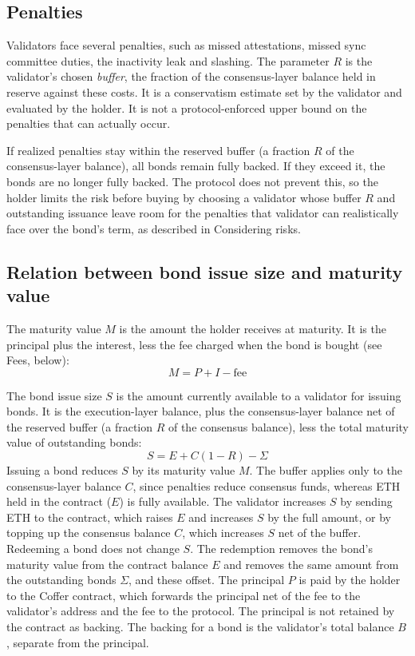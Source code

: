\documentclass{article}
\begin{document}
\subsection{Penalties}
Validators face several penalties, such as missed attestations, missed sync committee duties, the inactivity leak and slashing. The parameter \(R\) is the validator's chosen \textit{buffer}, the fraction of the consensus-layer balance held in reserve against these costs. It is a conservatism estimate set by the validator and evaluated by the holder. It is not a protocol-enforced upper bound on the penalties that can actually occur.

If realized penalties stay within the reserved buffer (a fraction \(R\) of the consensus-layer balance), all bonds remain fully backed. If they exceed it, the bonds are no longer fully backed. The protocol does not prevent this, so the holder limits the risk before buying by choosing a validator whose buffer \(R\) and outstanding issuance leave room for the penalties that validator can realistically face over the bond's term, as described in Considering risks.

\subsection{Relation between bond issue size and maturity value}
The maturity value \(M\) is the amount the holder receives at maturity. It is the principal plus the interest, less the fee charged when the bond is bought (see Fees, below):
\[
    M = P + I - \text{fee}
\]

The bond issue size \(S\) is the amount currently available to a validator for issuing bonds. It is the execution-layer balance, plus the consensus-layer balance net of the reserved buffer (a fraction \(R\) of the consensus balance), less the total maturity value of outstanding bonds:
\[
    S = E + C(1 - R) - \Sigma
\]
Issuing a bond reduces \(S\) by its maturity value \(M\). The buffer applies only to the consensus-layer balance \(C\), since penalties reduce consensus funds, whereas ETH held in the contract (\(E\)) is fully available. The validator increases \(S\) by sending ETH to the contract, which raises \(E\) and increases \(S\) by the full amount, or by topping up the consensus balance \(C\), which increases \(S\) net of the buffer. Redeeming a bond does not change \(S\). The redemption removes the bond's maturity value from the contract balance \(E\) and removes the same amount from the outstanding bonds \(\Sigma\), and these offset. The principal \(P\) is paid by the holder to the Coffer contract, which forwards the principal net of the fee to the validator's address and the fee to the protocol. The principal is not retained by the contract as backing. The backing for a bond is the validator's total balance \(B\), separate from the principal.
\end{document}
